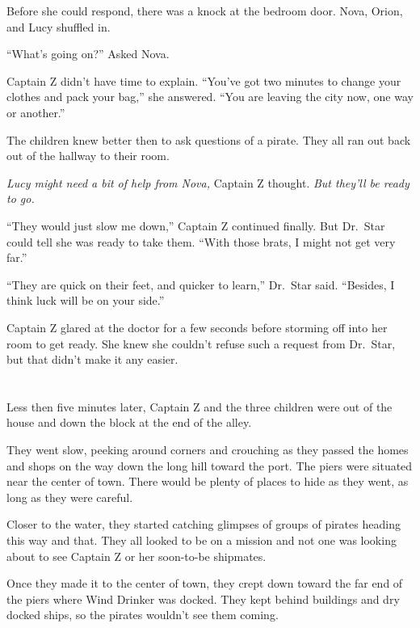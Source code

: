 \documentclass[12pt]{extbook}
\begin{document}
  Before she could respond, there was a knock at the bedroom door. Nova,
  Orion, and Lucy shuffled in.
  
  \enquote{What's going on?} Asked Nova.
  
  Captain Z didn't have time to explain. \enquote{You've got two minutes
  to change your clothes and pack your bag,} she answered. \enquote{You
  are leaving the city now, one way or another.}
  
  The children knew better then to ask questions of a pirate. They all ran
  out back out of the hallway to their room.
  
  \emph{Lucy might need a bit of help from Nova,} Captain Z thought.
  \emph{But they'll be ready to go.}
  
  \enquote{They would just slow me down,} Captain Z continued finally. But
  Dr.~Star could tell she was ready to take them. \enquote{With those
  brats, I might not get very far.}
  
  \enquote{They are quick on their feet, and quicker to learn,} Dr.~Star
  said. \enquote{Besides, I think luck will be on your side.}
  
  Captain Z glared at the doctor for a few seconds before storming off
  into her room to get ready. She knew she couldn't refuse such a request
  from Dr.~Star, but that didn't make it any easier.
  
  \section{}\label{section-38}
  
  Less then five minutes later, Captain Z and the three children were out
  of the house and down the block at the end of the alley.
  
  They went slow, peeking around corners and crouching as they passed the
  homes and shops on the way down the long hill toward the port. The piers
  were situated near the center of town. There would be plenty of places
  to hide as they went, as long as they were careful.
  
  Closer to the water, they started catching glimpses of groups of pirates
  heading this way and that. They all looked to be on a mission and not
  one was looking about to see Captain Z or her soon-to-be shipmates.
  
  Once they made it to the center of town, they crept down toward the far
  end of the piers where Wind Drinker was docked. They kept behind
  buildings and dry docked ships, so the pirates wouldn't see them coming.
  
\end{document}
